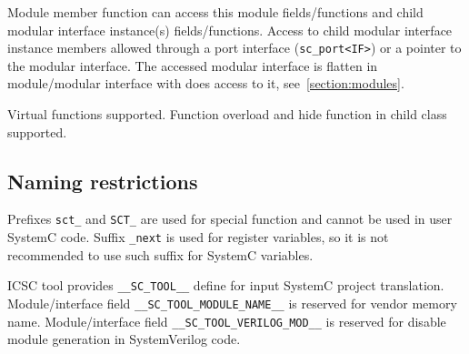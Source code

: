 Module member function can access this module fields/functions and child modular interface instance(s) fields/functions. Access to child modular interface instance members allowed through a port interface ({\tt sc\_port<IF>}) or a pointer to the modular interface. The accessed modular interface is flatten in module/modular interface with does access to it, see~\ref{section:modules}.

Virtual functions supported. Function overload and hide function in child class supported.


\subsection{Naming restrictions}

Prefixes {\tt sct\_} and {\tt SCT\_} are used for special function and cannot be used in user SystemC code.
Suffix {\tt \_next} is used for register variables, so it is not recommended to use such suffix for SystemC variables.

ICSC tool provides {\tt \_\_SC\_TOOL\_\_} define for input SystemC project translation. 
Module/interface field {\tt\_\_SC\_TOOL\_MODULE\_NAME\_\_} is reserved for vendor memory name. 
Module/interface field {\tt \_\_SC\_TOOL\_VERILOG\_MOD\_\_} is reserved for disable module generation in SystemVerilog code. 

